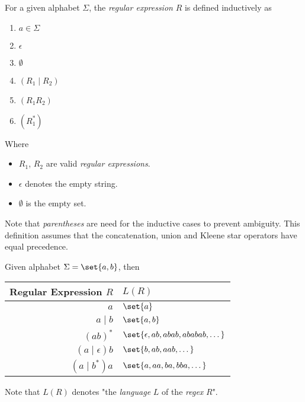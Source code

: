 \begin{definition}
    For a given alphabet $\Sigma$, the \textit{regular expression} $R$ is defined inductively as
    \begin{enumerate}
        \item $a \in \Sigma$
        \item $\epsilon$
        \item $\emptyset$
        \item $(R_1 \mid R_2)$
        \item $(R_1 R_2)$
        \item $(R_1^{\ast})$
    \end{enumerate}
    Where
    \begin{itemize}
        \item $R_1$, $R_2$ are valid \textit{regular expressions}.
        \item $\epsilon$ denotes the empty string.
        \item $\emptyset$ is the empty set.
    \end{itemize}
\end{definition}

\begin{remark}
    Note that \textit{parentheses} are need for the inductive cases to prevent ambiguity. This definition assumes that the concatenation, union and Kleene star operators have equal precedence.
\end{remark}

\begin{example}
    Given alphabet $\Sigma = \set{a, b}$, then
    \begin{table}[H]    
        \centering
        \begin{tabular}{@{} r  l @{}}
            \toprule
            Regular Expression $R$ & $L(R)$ \\
            \midrule
            $a$         & $\set{a}$ \\
            $a \mid b$  & $\set{a, b}$ \\
            $(ab)^\ast$ & 
                $\set{\epsilon, ab, abab, ababab, \dots}$ \\
            $(a \mid \epsilon)b$ & $\set{b, ab, aab, \dots}$ \\
            $(a \mid b^\ast)a$ & $\set{a, aa, ba, bba, \dots}$ \\
            \bottomrule
        \end{tabular}
    \end{table}
    
    Note that $L(R)$ denotes "the \textit{language} $L$ of the \textit{regex} $R$".
\end{example}

